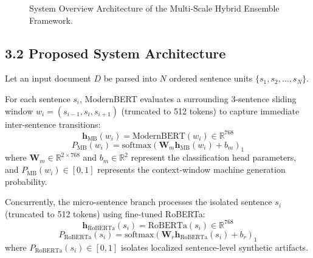 \documentclass[conference]{IEEEtran}
\begin{document}
\begin{figure}[htbp]
\centerline{}
\caption{System Overview Architecture of the Multi-Scale Hybrid Ensemble Framework.}
\label{fig_system_overview}
\end{figure}

\subsection{3.2 Proposed System Architecture}
Let an input document $D$ be parsed into $N$ ordered sentence units $\{s_1, s_2, \dots, s_N\}$.

For each sentence $s_i$, ModernBERT evaluates a surrounding 3-sentence sliding window $w_i = (s_{i-1}, s_i, s_{i+1})$ (truncated to 512 tokens) to capture immediate inter-sentence transitions:
\begin{equation}
    \mathbf{h}_{\text{MB}}(w_i) = \text{ModernBERT}(w_i) \in \mathbb{R}^{768}
\end{equation}
\begin{equation}
    P_{\text{MB}}(w_i) = \text{softmax}\left( \mathbf{W}_m \mathbf{h}_{\text{MB}}(w_i) + b_m \right)_1
\end{equation}
where $\mathbf{W}_m \in \mathbb{R}^{2 \times 768}$ and $b_m \in \mathbb{R}^2$ represent the classification head parameters, and $P_{\text{MB}}(w_i) \in [0, 1]$ represents the context-window machine generation probability.

Concurrently, the micro-sentence branch processes the isolated sentence $s_i$ (truncated to 512 tokens) using fine-tuned RoBERTa:
\begin{equation}
    \mathbf{h}_{\text{RoBERTa}}(s_i) = \text{RoBERTa}(s_i) \in \mathbb{R}^{768}
\end{equation}
\begin{equation}
    P_{\text{RoBERTa}}(s_i) = \text{softmax}\left( \mathbf{W}_r \mathbf{h}_{\text{RoBERTa}}(s_i) + b_r \right)_1
\end{equation}
where $P_{\text{RoBERTa}}(s_i) \in [0, 1]$ isolates localized sentence-level synthetic artifacts.
\end{document}
